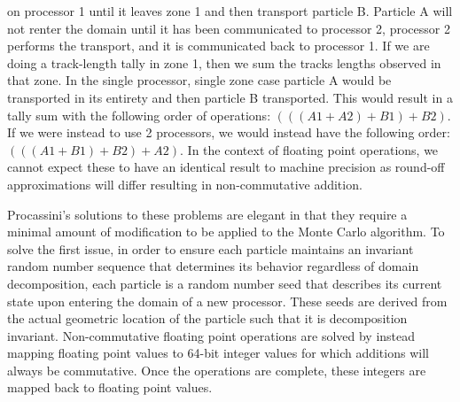 on processor 1 until it leaves zone 1 and then transport particle
B. Particle A will not renter the domain until it has been
communicated to processor 2, processor 2 performs the transport, and
it is communicated back to processor 1. If we are doing a track-length
tally in zone 1, then we sum the tracks lengths observed in that
zone. In the single processor, single zone case particle A would be
transported in its entirety and then particle B transported. This
would result in a tally sum with the following order of operations:
$(((A1+A2)+B1)+B2)$. If we were instead to use 2 processors, we would
instead have the following order: $(((A1+B1)+B2)+A2)$. In the context
of floating point operations, we cannot expect these to have an
identical result to machine precision as round-off approximations will
differ resulting in non-commutative addition.

Procassini's solutions to these problems are elegant in that they
require a minimal amount of modification to be applied to the Monte
Carlo algorithm. To solve the first issue, in order to ensure each
particle maintains an invariant random number sequence that determines
its behavior regardless of domain decomposition, each particle is a
random number seed that describes its current state upon entering the
domain of a new processor. These seeds are derived from the actual
geometric location of the particle such that it is decomposition
invariant. Non-commutative floating point operations are solved by
instead mapping floating point values to 64-bit integer values for
which additions will always be commutative. Once the operations are
complete, these integers are mapped back to floating point values.

